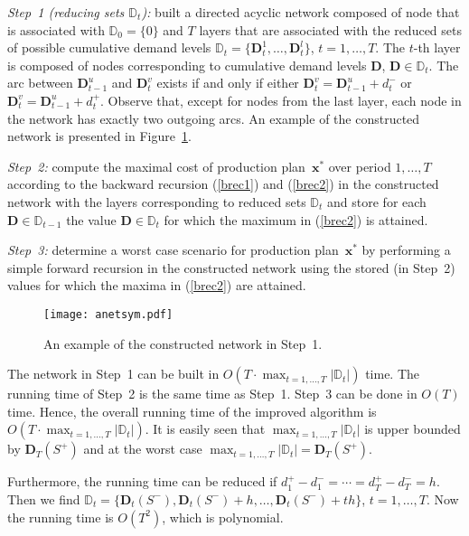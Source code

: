 \documentclass[11pt]{article}
\begin{document}
\noindent \emph{Step~1 (reducing sets $\mathbb{D}_{t}$):} built
a directed acyclic network composed of node
that is  associated with  $\mathbb{D}_{0}=\{0\}$ and 
$T$ layers that are associated with 
the reduced sets 
of possible  cumulative demand levels
$\mathbb{D}_{t}=\{\mathbf{D}^1_t,\ldots, \mathbf{D}^l_t\}$,
 $t=1,\ldots,T$.
The $t$-th layer is composed of nodes
corresponding  to cumulative demand levels $\mathbf{D}$, 
$\mathbf{D}\in
\mathbb{D}_{t}$.
The arc between $\mathbf{D}^u_{t-1}$ and $\mathbf{D}^v_t$ exists if and only if  either
 $\mathbf{D}^v_t=\mathbf{D}^u_{t-1}+d^{-}_t$ or
$\mathbf{D}^v_t=\mathbf{D}^u_{t-1}+d^{+}_t$.
Observe that, 
except for nodes from the last
layer,
each node in the network has
exactly two outgoing arcs.
An example of the constructed network is presented in Figure~\ref{fig1}.

\noindent \emph{Step~2:} 
compute the maximal cost of production plan~$\pmb{x}^{*}$ over period $1,\ldots,T$ according to the backward recursion (\ref{brec1}) and (\ref{brec2}) in the constructed
network with the layers corresponding to
reduced sets $\mathbb{D}_{t}$
and store for each $\mathbf{D}\in \mathbb{D}_{t-1}$
 the value $\mathbf{D}\in \mathbb{D}_{t}$ for which 
the maximum in (\ref{brec2}) is attained.

\noindent \emph{Step~3:} determine a worst case scenario for
production plan~$\pmb{x}^{*}$ by performing a simple 
forward recursion in the constructed network using the stored (in Step~2)
values for which 
the maxima in (\ref{brec2}) are attained.
\begin{figure}
\centering
	\texttt{[image: anetsym.pdf]}
	\caption{An example of the constructed network in Step~1.}\label{fig1}
\end{figure}




The network in Step~1 can be built in $O(T\cdot \max_{t=1,\ldots, T} |\mathbb{D}_{t}|)$ time.
The running time of Step~2 is  the same time as Step~1.
Step~3 can be done in $O(T)$ time. Hence, the overall running time of
the improved algorithm is $O(T\cdot \max_{t=1,\ldots, T} |\mathbb{D}_{t}|)$.
It is easily seen that $\max_{t=1,\ldots, T} |\mathbb{D}_{t}|$ is upper 
bounded by $\mathbf{D}_T(S^{+})$ and 
at the worst case $\max_{t=1,\ldots, T} |\mathbb{D}_{t}|=\mathbf{D}_T(S^{+})$.


Furthermore, the running time can be reduced if
$d^{+}_1-d^{-}_1=\cdots=d^{+}_T-d^{-}_T=h$.
Then we find 
$\mathbb{D}_t=\{\mathbf{D}_t(S^{-}), \mathbf{D}_t(S^{-})+h,\ldots,
 \mathbf{D}_t(S^{-})+t h\}$, $t=1,\ldots,T$.
 Now the running time is $O(T^{2})$, which is polynomial.
\end{document}
